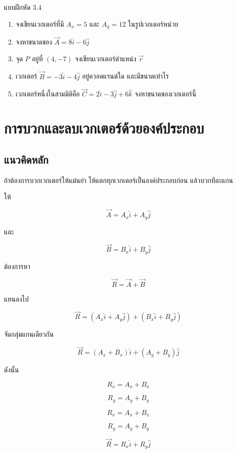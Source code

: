 \begin{exercisebox}{แบบฝึกหัด 3.4}
\begin{enumerate}
    \item จงเขียนเวกเตอร์ที่มี $A_x=5$ และ $A_y=12$ ในรูปเวกเตอร์หน่วย
    \item จงหาขนาดของ $\vec{A}=8\hat{i}-6\hat{j}$
    \item จุด $P$ อยู่ที่ $(4,-7)$ จงเขียนเวกเตอร์ตำแหน่ง $\vec{r}$
    \item เวกเตอร์ $\vec{B}=-3\hat{i}-4\hat{j}$ อยู่ควอดแรนต์ใด และมีขนาดเท่าไร
    \item เวกเตอร์หนึ่งในสามมิติคือ $\vec{C}=2\hat{i}-3\hat{j}+6\hat{k}$ จงหาขนาดของเวกเตอร์นี้
\end{enumerate}
\end{exercisebox}

\section{การบวกและลบเวกเตอร์ด้วยองค์ประกอบ}

\subsection{แนวคิดหลัก}

ถ้าต้องการบวกเวกเตอร์ให้แม่นยำ ให้แตกทุกเวกเตอร์เป็นองค์ประกอบก่อน แล้วบวกทีละแกน

ให้

\[
\vec{A}=A_x\hat{i}+A_y\hat{j}
\]

และ

\[
\vec{B}=B_x\hat{i}+B_y\hat{j}
\]

ต้องการหา

\[
\vec{R}=\vec{A}+\vec{B}
\]

แทนลงไป

\[
\vec{R}=(A_x\hat{i}+A_y\hat{j})+(B_x\hat{i}+B_y\hat{j})
\]

จัดกลุ่มแกนเดียวกัน

\[
\vec{R}=(A_x+B_x)\hat{i}+(A_y+B_y)\hat{j}
\]

ดังนั้น

\[
R_x=A_x+B_x
\]

\[
R_y=A_y+B_y
\]

\begin{tcolorbox}[title=สูตรบวกเวกเตอร์ด้วยองค์ประกอบ]
\[
R_x=A_x+B_x
\]

\[
R_y=A_y+B_y
\]

\[
\vec{R}=R_x\hat{i}+R_y\hat{j}
\]
\end{tcolorbox}

